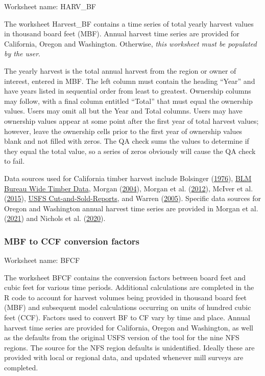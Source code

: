 \documentclass[
  openany]{book}
\begin{document}
Worksheet name: HARV\_BF

The worksheet Harvest\_BF contains a time series of total yearly harvest
values in thousand board feet (MBF). Annual harvest time series are
provided for California, Oregon and Washington. Otherwise, \emph{this
worksheet must be populated by the user}.

The yearly harvest is the total annual harvest from the region or owner
of interest, entered in MBF. The left column must contain the heading
``Year'' and have years listed in sequential order from least to
greatest. Ownership columns may follow, with a final column entitled
``Total'' that must equal the ownership values. Users may omit all but
the Year and Total columns. Users may have ownership values appear at
some point after the first year of total harvest values; however, leave
the ownership cells prior to the first year of ownership values blank
and not filled with zeros. The QA check sums the values to determine if
they equal the total value, so a series of zeros obviously will cause
the QA check to fail.

Data sources used for California timber harvest include Bolsinger
(\protect\hyperlink{ref-bolsinger1976}{1976}),
\href{https://www.blm.gov/programs/natural-resources/forests-and-woodlands/timber-sales/bureau-wide-timber-data}{BLM
Bureau Wide Timber Data}, Morgan
(\protect\hyperlink{ref-morgan2004}{2004}), Morgan et al.
(\protect\hyperlink{ref-morgan2012}{2012}), McIver et al.
(\protect\hyperlink{ref-mciver2015}{2015}),
\href{https://www.fs.fed.us/forestmanagement/products/cut-sold/index.shtml}{USFS
Cut-and-Sold-Reports}, and Warren
(\protect\hyperlink{ref-warren2005}{2005}). Specific data sources for
Oregon and Washington annual harvest time series are provided in Morgan
et al. (\protect\hyperlink{ref-morgan2021}{2021}) and Nichols et al.
(\protect\hyperlink{ref-nichols2020}{2020}).

\hypertarget{own-prov-input-bfcf}{%
\subsubsection{MBF to CCF conversion
factors}\label{own-prov-input-bfcf}}

Worksheet name: BFCF

The worksheet BFCF contains the conversion factors between board feet
and cubic feet for various time periods. Additional calculations are
completed in the R code to account for harvest volumes being provided in
thousand board feet (MBF) and subsequent model calculations occurring on
units of hundred cubic feet (CCF). Factors used to convert BF to CF vary
by time and place. Annual harvest time series are provided for
California, Oregon and Washington, as well as the defaults from the
original USFS version of the tool for the nine NFS regions. The source
for the NFS region defaults is unidentified. Ideally these are provided
with local or regional data, and updated whenever mill surveys are
completed.
\end{document}
